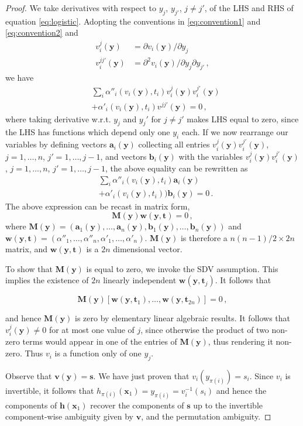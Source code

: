 \documentclass[letterpaper]{article}
\theoremstyle{definition}
\begin{document}
\begin{proof}
We take derivatives with respect to $y_j$, $y_{j'}$, $j \neq j'$,  of the LHS and RHS of equation \ref{eq:logistic}. Adopting the conventions in \ref{eq:convention1} and \ref{eq:convention2} and
\begin{align}
v^j_i(\bm{y})&=\partial v_i(\bm{y})/\partial y_j\\
v^{jj'}_i(\bm{y})&= \partial^2 v_i(\bm{y})/\partial y_j \partial y_{j'}\,,
\end{align}
we have
\begin{align*}
&\sum_{i} \alpha''_{i}(v_{i}(\bm{y}), t_{i})v^j_i(\bm{y})v^{j'}_i(\bm{y}) \\
&+ \alpha'_{i}(v_{i}(\bm{y}),  t_{i})v^{jj'}(\bm{y})=0\,,
\end{align*}
where taking derivative w.r.t. $y_j$ and $y_j'$ for $j \neq j'$ makes LHS equal to zero, since the LHS has functions which depend only one $y_i$ each.
If we now rearrange our variables by defining vectors $\bm{a}_i(\bm{y})$ collecting all entries $v_i^j(\bm{y})v_i^{j'}(\bm{y})$, $j=1, \ldots, n$, $j'=1, \ldots, j-1$, and vectors $\bm{b}_i(\bm{y})$ with the variables $v_i^j(\bm{y})v_i^{j'}(\bm{y})$, $j=1, \ldots, n$, $j'=1, \ldots, j-1$, the above equality can be rewritten as
\begin{align*}
&\sum_{i} \alpha''_{i}(v_{i}(\bm{y}), t_{i})\bm{a}_i(\bm{y}) \\
&+ \alpha'_{i}(v_{i}(\bm{y}),  t_{i}))\bm{b}_i(\bm{y})=0\,.
\end{align*}
The above expression can be recast in matrix form,
\[
\bm{M}(\bm{y})\bm{w}(\bm{y}, \bm{t})=0\,,
\]
where $\bm{M}(\bm{y}) = (\bm{a}_1(\bm{y}), \ldots,  \bm{a}_n(\bm{y}), \bm{b}_1(\bm{y}), \ldots, \bm{b}_n(\bm{y})) $ and $\bm{w}(\bm{y}, \bm{t}) = (\alpha''_{1}, \ldots, \alpha''_{n}, \alpha'_{1}, \ldots,\alpha'_{n})$. $\bm{M}(\bm{y})$ is therefore a $n(n-1)/2 \times 2n$ matrix, and $\bm{w}(\bm{y}, \bm{t})$ is a $2n$ dimensional vector.

To show that $\bm{M}(\bm{y})$ is equal to zero, we invoke the SDV assumption.
This implies the existence of $2n$ linearly independent $\bm{w}(\bm{y}, \bm{t}_j)$.
It follows that

\[
\bm{M}(\bm{y})[\bm{w}(\bm{y}, \bm{t}_1), \ldots, \bm{w}(\bm{y}, \bm{t}_{2n})]=0\,,
\]

and hence $\bm{M}(\bm{y})$ is zero by elementary linear algebraic results.
It follows that $v_i^j(\bm{y})\not=0$ for at most one value of $j$, since otherwise the product of two non-zero terms would appear in one of the entries of $\bm{M}(\bm{y})$, thus rendering it non-zero.
Thus $v_i$ is a function only of one $y_j$.

Observe that $\bm{v}(\bm{y}) = \bm{s}$.
We have just proven that $v_i(y_{\pi(i)}) = s_i$.
Since $v_i$ is invertible, it follows that $h_{\pi(i)}(\bm{x}_{1}) = y_{\pi(i)} = v_i^{-1}(s_i)$ and hence the components of $\bm{h}(\bm{x}_{1})$ recover the components of $\bm{s}$ up to the invertible component-wise ambiguity given by $\bm{v}$, and the permutation ambiguity.

\end{proof}
\end{document}
